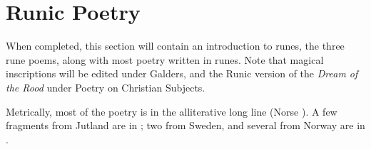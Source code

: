 \part{Runic Poetry}


When completed, this section will contain an introduction to runes, the three rune poems, along with most poetry written in runes.  Note that magical inscriptions will be edited under Galders, and the Runic version of the \emph{Dream of the Rood} under Poetry on Christian Subjects.

Metrically, most of the poetry is in the alliterative long line (Norse \Fornyrdislag).  A few fragments from Jutland are in \Ljodahattr; two from Sweden, and several from Norway are in \Drottkvett.




% 





% 





% 
